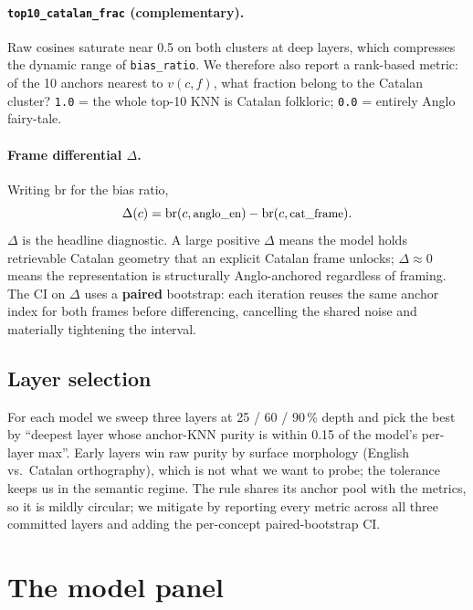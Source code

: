 \documentclass[10pt,twocolumn,a4paper]{article}
\newcommand{\code}[1]{\texttt{\small #1}}
\begin{document}
\paragraph{\code{top10\_catalan\_frac} (complementary).} Raw cosines saturate
near 0.5 on both clusters at deep layers, which compresses the dynamic range
of \code{bias\_ratio}. We therefore also report a rank-based metric: of the 10
anchors nearest to $v(c,f)$, what fraction belong to the Catalan cluster?
\code{1.0} = the whole top-10 KNN is Catalan folkloric; \code{0.0} = entirely
Anglo fairy-tale.

\paragraph{Frame differential $\Delta$.} Writing $\text{br}$ for the bias
ratio,
\begin{equation}
  \Delta(c) = \text{br}(c,\text{\small anglo\_en}) - \text{br}(c,\text{\small cat\_frame}).
\end{equation}
$\Delta$ is the headline diagnostic. A large positive $\Delta$ means the model
holds retrievable Catalan geometry that an explicit Catalan frame unlocks;
$\Delta \approx 0$ means the representation is structurally Anglo-anchored
regardless of framing. The CI on $\Delta$ uses a \textbf{paired} bootstrap:
each iteration reuses the same anchor index for both frames before
differencing, cancelling the shared noise and materially tightening the
interval.

\subsection{Layer selection}

For each model we sweep three layers at 25 / 60 / 90\,\% depth and pick the
best by ``deepest layer whose anchor-KNN purity is within 0.15 of the model's
per-layer max''. Early layers win raw purity by surface morphology (English
vs.\ Catalan orthography), which is not what we want to probe; the tolerance
keeps us in the semantic regime. The rule shares its anchor pool with the
metrics, so it is mildly circular; we mitigate by reporting every metric
across all three committed layers and adding the per-concept paired-bootstrap
CI.

\section{The model panel}\label{sec:panel}
\end{document}
